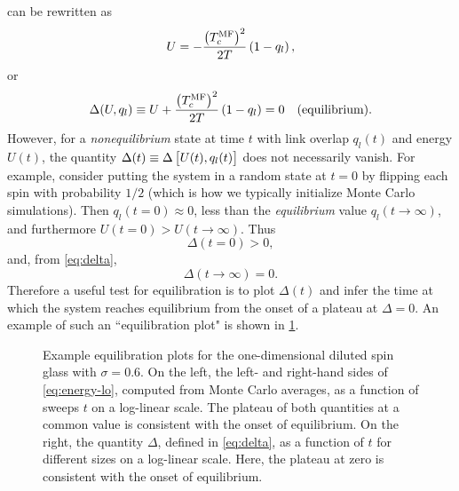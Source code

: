  can be rewritten as
\begin{equation}
  U = - \frac{\left(T_c^{\mathrm{MF}}\right)^2}{2T} \left(1 - q_l\right),
  \label{eq:energy-lo}
\end{equation}
or
\begin{equation}
  \Delta(U,q_l) \equiv
  U + \frac{\left(T_c^{\mathrm{MF}}\right)^2}{2T} \left(1 - q_l\right) = 0
  \quad\text{(equilibrium).}
  \label{eq:delta}
\end{equation}
However, for a \emph{nonequilibrium} state at time $t$ with link overlap
$q_l(t)$ and energy $U(t)$, the quantity $\Delta(t) \equiv
\Delta\left[U(t),q_l(t)\right]$ does not necessarily vanish. For example, consider
putting the system in a random state at $t=0$ by flipping each spin with
probability $1/2$ (which is how we typically initialize Monte Carlo
simulations). Then $q_l(t=0) \approx 0$, less than the \emph{equilibrium} value
$q_l(t \to \infty)$, and furthermore $U(t=0) > U(t \to \infty)$. Thus
\begin{equation}
  \Delta(t=0) > 0,
\end{equation}
and, from \cref{eq:delta},
\begin{equation}
  \Delta(t \to \infty) = 0.
\end{equation}
Therefore a useful test for equilibration is to plot $\Delta(t)$ and infer the
time at which the system reaches equilibrium from the onset of a plateau at
$\Delta=0$. An example of such an ``equilibration plot" is shown in
\cref{fig:equil}.


\begin{figure}
  \centering
  
  
  \caption[%
    Example equilibration plots for a spin glass model with Gaussian couplings.
  ]
  {%
    Example equilibration plots for the one-dimensional diluted spin glass with
    $\sigma=0.6$. On the left, the left- and right-hand sides of
    \cref{eq:energy-lo}, computed from Monte Carlo averages, as a function of
    sweeps $t$ on a log-linear scale. The plateau of both quantities at a
    common value is consistent with the onset of equilibrium. On the right, the
    quantity $\Delta$, defined in \cref{eq:delta}, as a function of $t$ for
    different sizes on a log-linear scale. Here, the plateau at zero is
    consistent with the onset of equilibrium.
  }
  \label{fig:equil}
\end{figure}

